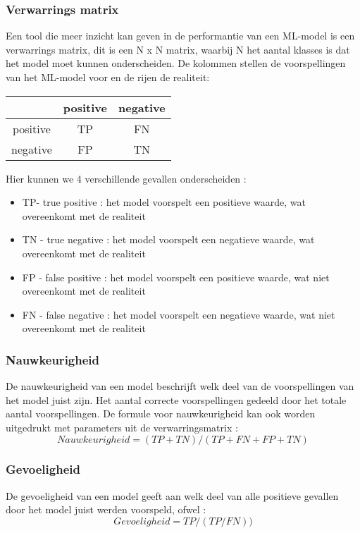 \subsubsection{Verwarrings matrix}
Een tool die meer inzicht kan geven in de performantie van een ML-model is een verwarrings matrix, dit is een N x N matrix, waarbij N het aantal klasses is dat het model moet kunnen onderscheiden.  De kolommen stellen de voorspellingen van het ML-model voor en de rijen de realiteit: 
\begin{center}
    \begin{tabular} {|c | c | c |}
        \hline
        & positive & negative \\
        \hline
       positive & TP & FN \\
        \hline
         negative & FP  & TN \\
        \hline
    \end{tabular}
\end{center}
Hier kunnen we 4 verschillende gevallen onderscheiden : 
\begin{itemize}
    \item TP- true positive : het model voorspelt een positieve waarde, wat overeenkomt met de realiteit
    \item TN - true negative : het model voorspelt een negatieve waarde, wat overeenkomt met de realiteit
    \item FP - false positive : het model voorspelt een positieve waarde, wat niet overeenkomt met de realiteit
    \item FN - false negative : het model voorspelt een negatieve waarde, wat niet overeenkomt met de realiteit
\end{itemize}

\subsubsection{Nauwkeurigheid}
De nauwkeurigheid van een model beschrijft welk deel van de voorspellingen van het model juist zijn. Het aantal correcte voorspellingen gedeeld door het totale aantal voorspellingen. De formule voor nauwkeurigheid kan ook worden uitgedrukt met parameters uit de verwarringsmatrix : 
\[Nauwkeurigheid = (TP + TN) / (TP + FN +FP + TN)\]

\subsubsection{Gevoeligheid}
De gevoeligheid van een model geeft aan welk deel van alle positieve gevallen door het model juist werden voorspeld, ofwel : 
\[Gevoeligheid = TP / (TP / FN) )\]

